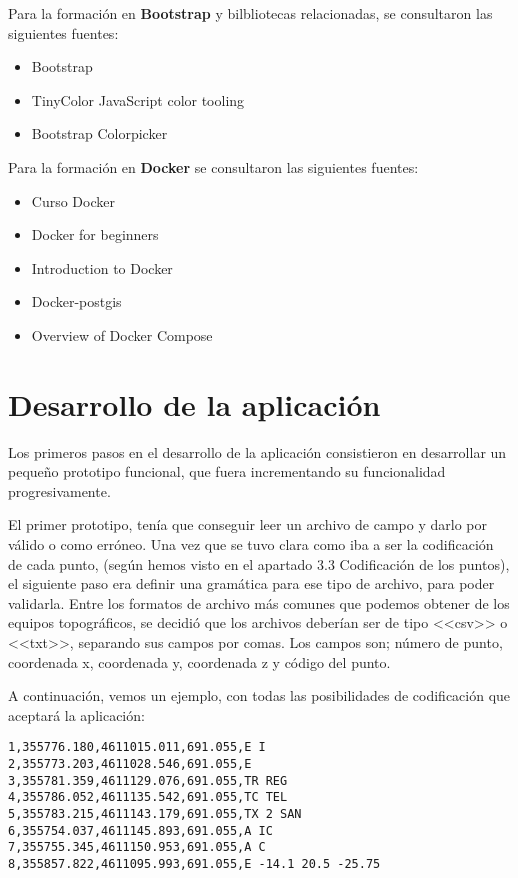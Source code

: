Para la formación en \textbf{Bootstrap} y bilbliotecas relacionadas, se consultaron las siguientes fuentes:

\begin{itemize}
\item Bootstrap \cite{Bootstrap}
\item TinyColor JavaScript color tooling \cite{TinyColor}
\item Bootstrap Colorpicker \cite{Colorpicker}
\end{itemize}


Para la formación en \textbf{Docker} se consultaron las siguientes fuentes:

\begin{itemize}
\item Curso Docker \cite{Docker}
\item Docker for beginners \cite{Docker_1}
\item Introduction to Docker \cite{Docker_2}
\item Docker-postgis \cite{Docker_3}
\item Overview of Docker Compose \cite{Docker_4}
\end{itemize}

\section{Desarrollo de la aplicación}

Los primeros pasos en el desarrollo de la aplicación consistieron en desarrollar un pequeño prototipo funcional, que fuera incrementando su funcionalidad progresivamente.

El primer prototipo, tenía que conseguir leer un archivo de campo y darlo por válido o como erróneo. Una vez que se tuvo clara como iba a ser la codificación de cada punto, (según hemos visto en el apartado 3.3 Codificación de los puntos), el siguiente paso era definir una gramática para ese tipo de archivo, para poder validarla. Entre los formatos de archivo más comunes que podemos obtener de los equipos topográficos, se decidió que los archivos deberían ser de tipo <<csv>> o <<txt>>, separando sus campos por comas. Los campos son; número de punto, coordenada x, coordenada y, coordenada z y código del punto. 

A continuación, vemos un ejemplo, con todas las posibilidades de codificación que aceptará la aplicación: 
\begin{verbatim}
1,355776.180,4611015.011,691.055,E I
2,355773.203,4611028.546,691.055,E
3,355781.359,4611129.076,691.055,TR REG
4,355786.052,4611135.542,691.055,TC TEL
5,355783.215,4611143.179,691.055,TX 2 SAN
6,355754.037,4611145.893,691.055,A IC
7,355755.345,4611150.953,691.055,A C
8,355857.822,4611095.993,691.055,E -14.1 20.5 -25.75
\end{verbatim}

